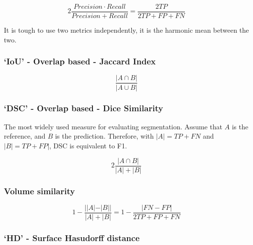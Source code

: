 \documentclass[11pt]{article}
\begin{document}
\begin{definition}[F1 score]
    \begin{equation*}
        2\frac{Precision \cdot Recall}{Precision + Recall} = \frac{2TP}{2TP + FP + FN}
    \end{equation*}
\end{definition}

It is tough to use two metrics independently, it is the harmonic mean between the two.

\subsubsection{`IoU' - Overlap based - Jaccard Index}

\begin{definition}
    \begin{equation*}
        \frac{|A\cap B|}{|A \cup B|}
    \end{equation*}
\end{definition}

\subsubsection{`DSC' - Overlap based - Dice Similarity}

The most widely used measure for evaluating segmentation. Assume that $A$ is the reference, and $B$ is the prediction. Therefore, with $|A| = TP + FN$ and $|B| = TP + FP|$, DSC is equivalent to F1.

\begin{definition}[DICE]
    \begin{equation*}
        2\frac{|A\cap B|}{|A|+|B|}
    \end{equation*}
\end{definition}

\subsubsection{Volume similarity}

\begin{definition}
    \begin{equation*}
        1 - \frac{||A| - |B||}{|A| + |B|} = 1 - \frac{|FN - FP|}{2TP + FP + FN}
    \end{equation*}
\end{definition}

\subsubsection{`HD' - Surface Hasudorff distance}
\end{document}
